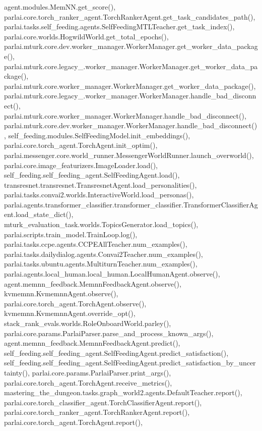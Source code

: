 agent.\+modules.\+Mem\+N\+N.\+get\+\_\+score(), parlai.\+core.\+torch\+\_\+ranker\+\_\+agent.\+Torch\+Ranker\+Agent.\+get\+\_\+task\+\_\+candidates\+\_\+path(), parlai.\+tasks.\+self\+\_\+feeding.\+agents.\+Self\+Feeding\+M\+T\+L\+Teacher.\+get\+\_\+task\+\_\+index(), parlai.\+core.\+worlds.\+Hogwild\+World.\+get\+\_\+total\+\_\+epochs(), parlai.\+mturk.\+core.\+dev.\+worker\+\_\+manager.\+Worker\+Manager.\+get\+\_\+worker\+\_\+data\+\_\+package(), parlai.\+mturk.\+core.\+legacy\+\_.\+worker\+\_\+manager.\+Worker\+Manager.\+get\+\_\+worker\+\_\+data\+\_\+package(), parlai.\+mturk.\+core.\+worker\+\_\+manager.\+Worker\+Manager.\+get\+\_\+worker\+\_\+data\+\_\+package(), parlai.\+mturk.\+core.\+legacy\+\_.\+worker\+\_\+manager.\+Worker\+Manager.\+handle\+\_\+bad\+\_\+disconnect(), parlai.\+mturk.\+core.\+worker\+\_\+manager.\+Worker\+Manager.\+handle\+\_\+bad\+\_\+disconnect(), parlai.\+mturk.\+core.\+dev.\+worker\+\_\+manager.\+Worker\+Manager.\+handle\+\_\+bad\+\_\+disconnect(), self\+\_\+feeding.\+modules.\+Self\+Feeding\+Model.\+init\+\_\+embeddings(), parlai.\+core.\+torch\+\_\+agent.\+Torch\+Agent.\+init\+\_\+optim(), parlai.\+messenger.\+core.\+world\+\_\+runner.\+Messenger\+World\+Runner.\+launch\+\_\+overworld(), parlai.\+core.\+image\+\_\+featurizers.\+Image\+Loader.\+load(), self\+\_\+feeding.\+self\+\_\+feeding\+\_\+agent.\+Self\+Feeding\+Agent.\+load(), transresnet.\+transresnet.\+Transresnet\+Agent.\+load\+\_\+personalities(), parlai.\+tasks.\+convai2.\+worlds.\+Interactive\+World.\+load\+\_\+personas(), parlai.\+agents.\+transformer\+\_\+classifier.\+transformer\+\_\+classifier.\+Transformer\+Classifier\+Agent.\+load\+\_\+state\+\_\+dict(), mturk\+\_\+evaluation\+\_\+task.\+worlds.\+Topics\+Generator.\+load\+\_\+topics(), parlai.\+scripts.\+train\+\_\+model.\+Train\+Loop.\+log(), parlai.\+tasks.\+ccpe.\+agents.\+C\+C\+P\+E\+All\+Teacher.\+num\+\_\+examples(), parlai.\+tasks.\+dailydialog.\+agents.\+Convai2\+Teacher.\+num\+\_\+examples(), parlai.\+tasks.\+ubuntu.\+agents.\+Multiturn\+Teacher.\+num\+\_\+examples(), parlai.\+agents.\+local\+\_\+human.\+local\+\_\+human.\+Local\+Human\+Agent.\+observe(), agent.\+memnn\+\_\+feedback.\+Memnn\+Feedback\+Agent.\+observe(), kvmemnn.\+Kvmemnn\+Agent.\+observe(), parlai.\+core.\+torch\+\_\+agent.\+Torch\+Agent.\+observe(), kvmemnn.\+Kvmemnn\+Agent.\+override\+\_\+opt(), stack\+\_\+rank\+\_\+evals.\+worlds.\+Role\+Onboard\+World.\+parley(), parlai.\+core.\+params.\+Parlai\+Parser.\+parse\+\_\+and\+\_\+process\+\_\+known\+\_\+args(), agent.\+memnn\+\_\+feedback.\+Memnn\+Feedback\+Agent.\+predict(), self\+\_\+feeding.\+self\+\_\+feeding\+\_\+agent.\+Self\+Feeding\+Agent.\+predict\+\_\+satisfaction(), self\+\_\+feeding.\+self\+\_\+feeding\+\_\+agent.\+Self\+Feeding\+Agent.\+predict\+\_\+satisfaction\+\_\+by\+\_\+uncertainty(), parlai.\+core.\+params.\+Parlai\+Parser.\+print\+\_\+args(), parlai.\+core.\+torch\+\_\+agent.\+Torch\+Agent.\+receive\+\_\+metrics(), mastering\+\_\+the\+\_\+dungeon.\+tasks.\+graph\+\_\+world2.\+agents.\+Default\+Teacher.\+report(), parlai.\+core.\+torch\+\_\+classifier\+\_\+agent.\+Torch\+Classifier\+Agent.\+report(), parlai.\+core.\+torch\+\_\+ranker\+\_\+agent.\+Torch\+Ranker\+Agent.\+report(), parlai.\+core.\+torch\+\_\+agent.\+Torch\+Agent.\+report(), 